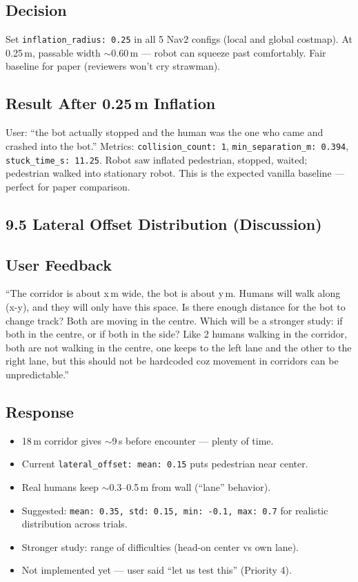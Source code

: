 \documentclass[11pt]{article}
\newcommand{\logentry}[1]{\subsection*{#1}}
\begin{document}
\logentry{Decision}
Set \texttt{inflation\_radius: 0.25} in all 5 Nav2 configs (local and global
costmap). At 0.25\,m, passable width $\sim$0.60\,m --- robot can squeeze past
comfortably. Fair baseline for paper (reviewers won't cry strawman).

\logentry{Result After 0.25\,m Inflation}
User: ``the bot actually stopped and the human was the one who came and crashed
into the bot.'' Metrics: \texttt{collision\_count: 1}, \texttt{min\_separation\_m:
0.394}, \texttt{stuck\_time\_s: 11.25}. Robot saw inflated pedestrian, stopped,
waited; pedestrian walked into stationary robot. This is the expected vanilla
baseline --- perfect for paper comparison.


\subsection*{9.5 Lateral Offset Distribution (Discussion)}

\logentry{User Feedback}
``The corridor is about x\,m wide, the bot is about y\,m. Humans will walk along
(x-y), and they will only have this space. Is there enough distance for the bot
to change track? Both are moving in the centre. Which will be a stronger study:
if both in the centre, or if both in the side? Like 2 humans walking in the
corridor, both are not walking in the centre, one keeps to the left lane and
the other to the right lane, but this should not be hardcoded coz movement in
corridors can be unpredictable.''

\logentry{Response}
\begin{itemize}
  \item 18\,m corridor gives $\sim$9\,s before encounter --- plenty of time.
  \item Current \texttt{lateral\_offset: mean: 0.15} puts pedestrian near center.
  \item Real humans keep $\sim$0.3--0.5\,m from wall (``lane'' behavior).
  \item Suggested: \texttt{mean: 0.35, std: 0.15, min: -0.1, max: 0.7} for
    realistic distribution across trials.
  \item Stronger study: range of difficulties (head-on center vs own lane).
  \item Not implemented yet --- user said ``let us test this'' (Priority 4).
\end{itemize}

\end{document}
